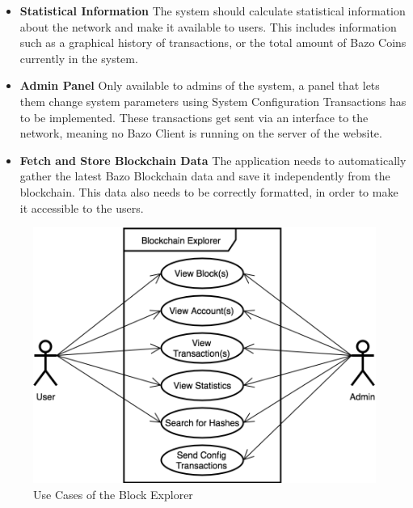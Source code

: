 \begin{itemize}
\item \textbf{Statistical Information}
The system should calculate statistical information about the network and make it available to users. This includes information such as a graphical history of transactions, or the total amount of Bazo Coins currently in the system.
\item \textbf{Admin Panel}
Only available to admins of the system, a panel that lets them change system parameters using System Configuration Transactions has to be implemented. These transactions get sent via an interface \cite{marc} to the network, meaning no Bazo Client is running on the server of the website.
\item \textbf{Fetch and Store Blockchain Data}
The application needs to automatically gather the latest Bazo Blockchain data and save it independently from the blockchain. This data also needs to be correctly formatted, in order to make it accessible to the users. 
\end{itemize}

\begin{figure}
  \includegraphics[scale=0.35]{usecase1.png}
  \centering
  \caption{Use Cases of the Block Explorer}
  \label{fig:usecase1}
\end{figure}

